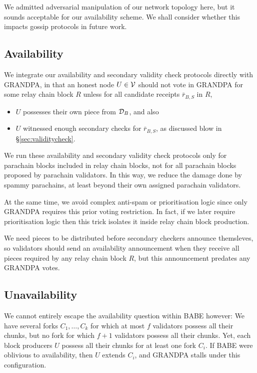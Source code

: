 We admitted adversarial manipulation of our network topology here, but it sounds acceptable for our availability scheme.  We shall consider whether this impacts gossip protocols in future work. 


\subsection{Availability} %
\label{sec:availability}

We integrate our availability and secondary validity check protocols directly with GRANDPA, in that an honest node $U \in \mathcal{V}$ should not vote in GRANDPA for some relay chain block $R$ unless for all candidate receipts $\bar{r}_{B,S}$ in $R$,
\begin{itemize}
\item $U$ possesses their own piece from $\mathcal{D}_B$, and also
\item $U$ witnessed enough secondary checks for $\bar{r}_{B,S}$,
 as discussed blow in \S\ref{sec:validitycheck}.
\end{itemize}

We run these availability and secondary validity check protocols only for parachain blocks included in relay chain blocks, not for all parachain blocks proposed by parachain validators.  In this way, we reduce the damage done by spammy parachains, at least beyond their own assigned parachain validators.

At the same time, we avoid complex anti-spam or prioritisation logic since only GRANDPA requires this prior voting restriction.  In fact, if we later require prioritisation logic then this trick isolates it inside relay chain block production.

We need pieces to be distributed before secondary checkers announce themsleves, so validators should send an availability announcement when they receive all pieces required by any relay chain block $R$, but this announcement predates any GRANDPA votes. 


\subsection{Unavailability} %
\label{sec:unavailability}

We cannot entirely escape the availability question within BABE however:  We have several forks $C_1,\ldots,C_k$ for which at most $f$ validators possess all their chunks, but no fork for which $f+1$ validators possess all their chunks.  Yet, each block producers $U$ possess all their chunks for at least one fork $C_i$.  If BABE were oblivious to availability, then $U$ extends $C_i$, and GRANDPA stalls under this configuration. 

